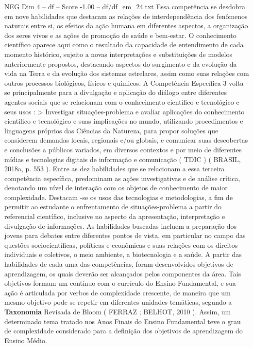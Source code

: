 \begin{textsample}{NEG Dim 4 – df – Score -1.00 – df/df\_em\_24.txt}
Essa competência se desdobra em nove habilidades que destacam as relações de interdependência dos fenômenos naturais entre si, os efeitos da ação humana em diferentes aspectos, a organização dos seres vivos e as ações de promoção de saúde e bem-estar.
O conhecimento científico aparece aqui como o resultado da capacidade de entendimento de cada momento histórico, sujeito a novas interpretações e substituições de modelos anteriormente propostos, destacando aspectos do surgimento e da evolução da vida na Terra e da evolução dos sistemas estrelares, assim como suas relações com outros processos biológicos, físicos e químicos.
A Competência Específica 3 volta -se principalmente para a divulgação e aplicação do diálogo entre diferentes agentes sociais que se relacionam com o conhecimento científico e tecnológico e seus usos : > Investigar situações-problema e avaliar aplicações do conhecimento científico e tecnológico e suas implicações no mundo, utilizando procedimentos e linguagens próprios das Ciências da Natureza, para propor soluções que considerem demandas locais, regionais e/ou globais, e comunicar suas descobertas e conclusões a públicos variados, em diversos contextos e por meio de diferentes mídias e tecnologias digitais de informação e comunicação ( TDIC ) ( BRASIL, 2018a, p. 553 ).
Entre as dez habilidades que se relacionam a essa terceira competência específica, predominam as ações investigativas e de análise crítica, denotando um nível de interação com os objetos de conhecimento de maior complexidade.
Destacam -se os usos das tecnologias e metodologias, a fim de permitir ao estudante o enfrentamento de situações-problema a partir do referencial científico, inclusive no aspecto da apresentação, interpretação e divulgação de informações.
As habilidades buscadas incluem a preparação dos jovens para debates entre diferentes pontos de vista, em particular no campo das questões sociocientíficas, políticas e econômicas e suas relações com os direitos individuais e coletivos, o meio ambiente, a biotecnologia e a saúde.
A partir das habilidades de cada uma das competências, foram desenvolvidos objetivos de aprendizagem, os quais deverão ser alcançados pelos componentes da área.
Tais objetivos formam um contínuo com o currículo do Ensino Fundamental, e sua ação é articulada por verbos de complexidade crescente, de maneira que um mesmo objetivo pode se repetir em diferentes unidades temáticas, segundo a \textbf{Taxonomia} Revisada de Bloom ( FERRAZ ; BELHOT, 2010 ).
Assim, um determinado tema tratado nos Anos Finais do Ensino Fundamental teve o grau de complexidade considerado para a definição dos objetivos de aprendizagem do Ensino Médio.

\end{textsample}
